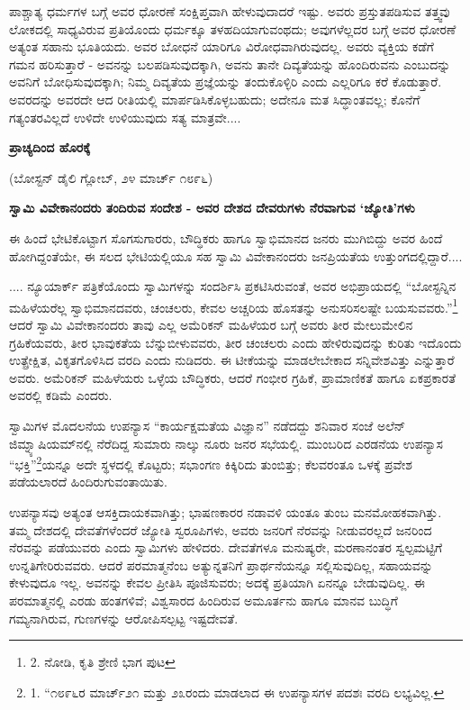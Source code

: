 ಪಾಶ್ಚಾತ್ಯ ಧರ್ಮಗಳ ಬಗ್ಗೆ ಅವರ ಧೋರಣೆ ಸಂಕ್ಷಿಪ್ತವಾಗಿ ಹೇಳುವುದಾದರೆ ಇಷ್ಟು. ಅವರು ಪ್ರಸ್ತುತಪಡಿಸುವ ತತ್ತ್ವವು ಲೋಕದಲ್ಲಿ ಸಾಧ್ಯವಿರುವ ಪ್ರತಿಯೊಂದು ಧರ್ಮಕ್ಕೂ ತಳಹದಿಯಾಗುವಂಥದು; ಅವುಗಳೆಲ್ಲದರ ಬಗ್ಗೆ ಅವರ ಧೋರಣೆ ಅತ್ಯಂತ ಸಹಾನು ಭೂತಿಯದು. ಅವರ ಬೋಧನೆ ಯಾರಿಗೂ ವಿರೋಧವಾಗಿರುವುದಲ್ಲ. ಅವರು ವ್ಯಕ್ತಿಯ ಕಡೆಗೆ ಗಮನ ಹರಿಸುತ್ತಾರೆ - ಅವನನ್ನು ಬಲಪಡಿಸುವುದಕ್ಕಾಗಿ, ಅವನು ತಾನೇ ದಿವ್ಯತೆಯನ್ನು ಹೊಂದಿರುವನು ಎಂಬುದನ್ನು ಅವನಿಗೆ ಬೋಧಿಸುವುದಕ್ಕಾಗಿ; ನಿಮ್ಮ ದಿವ್ಯತೆಯ ಪ್ರಜ್ಞೆಯನ್ನು ತಂದುಕೊಳ್ಳಿರಿ ಎಂದು ಎಲ್ಲರಿಗೂ ಕರೆ ಕೊಡುತ್ತಾರೆ. ಅವರದನ್ನು ಅವರದೇ ಆದ ರೀತಿಯಲ್ಲಿ ಮಾರ್ಪಡಿಸಿಕೊಳ್ಳಬಹುದು; ಅದೇನೂ ಮತ ಸಿದ್ಧಾಂತವಲ್ಲ; ಕೊನೆಗೆ ಗತ್ಯಂತರವಿಲ್ಲದೆ ಉಳಿದೇ ಉಳಿಯುವುದು ಸತ್ಯ ಮಾತ್ರವೇ....

\begin{center}
\textbf{ಪ್ರಾಚ್ಯದಿಂದ ಹೊರಕ್ಕೆ}
\end{center}

\begin{center}
(ಬೋಸ್ಟನ್ ಡೈಲಿ ಗ್ಲೋಬ್, ೨೪ ಮಾರ್ಚ್ ೧೮೯೬)
\end{center}

\begin{center}
\textbf{ಸ್ವಾಮಿ ವಿವೇಕಾನಂದರು ತಂದಿರುವ ಸಂದೇಶ - ಅವರ ದೇಶದ ದೇವರುಗಳು ನೆರವಾಗುವ ‘ಜ್ಯೋತಿ’ಗಳು}
\end{center}

ಈ ಹಿಂದೆ ಭೇಟಿಕೊಟ್ಟಾಗ ಸೊಗಸುಗಾರರು, ಬೌದ್ಧಿಕರು ಹಾಗೂ ಸ್ವಾಭಿಮಾನದ ಜನರು ಮುಗಿಬಿದ್ದು ಅವರ ಹಿಂದೆ ಹೋಗಿದ್ದಂತೆಯೇ, ಈ ಸಲದ ಭೇಟಿಯಲ್ಲಿಯೂ ಸಹ ಸ್ವಾಮಿ ವಿವೇಕಾನಂದರು ಜನಪ್ರಿಯತೆಯ ಉತ್ತುಂಗದಲ್ಲಿದ್ದಾರೆ....

.... ನ್ಯೂಯಾರ್ಕ್ ಪತ್ರಿಕೆಯೊಂದು ಸ್ವಾಮಿಗಳನ್ನು ಸಂದರ್ಶಿಸಿ ಪ್ರಕಟಿಸಿರುವಂತೆ, ಅವರ ಅಭಿಪ್ರಾಯದಲ್ಲಿ “ಬೋಸ್ಟನ್ನಿನ ಮಹಿಳೆಯರೆಲ್ಲ ಸ್ವಾಭಿಮಾನದವರು, ಚಂಚಲರು, ಕೇವಲ ಅಚ್ಚರಿಯ ಹೊಸತನ್ನು ಅನುಸರಿಸಲಷ್ಟೇ ಬಯಸುವವರು.”\footnote{2. ನೋಡಿ, ಕೃತಿ ಶ್ರೇಣಿ ಭಾಗ  ಪುಟ } ಆದರೆ ಸ್ವಾಮಿ ವಿವೇಕಾನಂದರು ತಾವು ಎಲ್ಲ ಅಮೆರಿಕನ್ ಮಹಿಳೆಯರ ಬಗ್ಗೆ ಅವರು ತೀರ ಮೇಲುಮೇಲಿನ ಗ್ರಹಿಕೆಯವರು, ತೀರ ಭಾವುಕತೆಯ ಬೆನ್ನುಬೀಳುವವರು, ತೀರ ಚಂಚಲರು ಎಂದು ಹೇಳಿರುವುದನ್ನು ಕುರಿತು ಇದೊಂದು ಉತ್ಪ್ರೇಕ್ಷಿತ, ವಿಕೃತಗೊಳಿಸಿದ ವರದಿ ಎಂದು ನುಡಿದರು. ಈ ಟೀಕೆಯನ್ನು ಮಾಡಲೇಬೇಕಾದ ಸನ್ನಿವೇಶವಿತ್ತು ಎನ್ನುತ್ತಾರೆ ಅವರು. ಅಮೆರಿಕನ್ ಮಹಿಳೆಯರು ಒಳ್ಳೆಯ ಬೌದ್ಧಿಕರು, ಆದರೆ ಗಂಭೀರ ಗ್ರಹಿಕೆ, ಪ್ರಾಮಾಣಿಕತೆ ಹಾಗೂ ಏಕಪ್ರಕಾರತೆ ಅವರಲ್ಲಿ ಕಡಿಮೆ ಎಂದರು.

ಸ್ವಾಮಿಗಳ ಮೊದಲನೆಯ ಉಪನ್ಯಾಸ “ಕಾರ್ಯಕ್ಷಮತೆಯ ವಿಜ್ಞಾನ” ನಡೆದದ್ದು ಶನಿವಾರ ಸಂಜೆ ಅಲೆನ್ ಜಿಮ್ನ್ಯಾಷಿಯಮ್​ನಲ್ಲಿ ನೆರೆದಿದ್ದ ಸುಮಾರು ನಾಲ್ಕು ನೂರು ಜನರ ಸಭೆಯಲ್ಲಿ. ಮುಂಬರಿದ ಎರಡನೆಯ ಉಪನ್ಯಾಸ “ಭಕ್ತಿ”\footnote{1. “೧೮೯೬ರ ಮಾರ್ಚ್೨೧ ಮತ್ತು ೨೩ರಂದು ಮಾಡಲಾದ ಈ ಉಪನ್ಯಾಸಗಳ ಪದಶಃ ವರದಿ ಲಭ್ಯವಿಲ್ಲ.}ಯನ್ನೂ ಅದೇ ಸ್ಥಳದಲ್ಲಿ ಕೊಟ್ಟರು; ಸಭಾಂಗಣ ಕಿಕ್ಕಿರಿದು ತುಂಬಿತ್ತು; ಕೆಲವರಂತೂ ಒಳಕ್ಕೆ ಪ್ರವೇಶ ಪಡೆಯಲಾರದೆ ಹಿಂದಿರುಗುವಂತಾಯಿತು.

ಉಪನ್ಯಾಸವು ಅತ್ಯಂತ ಆಸಕ್ತಿದಾಯಕವಾಗಿತ್ತು; ಭಾಷಣಕಾರರ ನಡಾವಳಿ ಯಂತೂ ತುಂಬ ಮನಮೋಹಕವಾಗಿತ್ತು. ತಮ್ಮ ದೇಶದಲ್ಲಿ ದೇವತೆಗಳೆಂದರೆ ಜ್ಯೋತಿ ಸ್ವರೂಪಿಗಳು, ಅವರು ಜನರಿಗೆ ನೆರವನ್ನು ನೀಡುವರಲ್ಲದೆ ಜನರಿಂದ ನೆರವನ್ನು ಪಡೆಯುವರು ಎಂದು ಸ್ವಾಮಿಗಳು ಹೇಳಿದರು. ದೇವತೆಗಳೂ ಮನುಷ್ಯರೇ, ಮರಣಾನಂತರ ಸ್ವಲ್ಪಮಟ್ಟಿಗೆ ಉನ್ನತಿಗೇರಿರುವವರು. ಆದರೆ ಪರಮಾತ್ಮನೆಂಬ ಅತ್ಯುನ್ನತನಿಗೆ ಪ್ರಾರ್ಥನೆಯನ್ನೂ ಸಲ್ಲಿಸುವುದಿಲ್ಲ, ಸಹಾಯವನ್ನು ಕೇಳುವುದೂ ಇಲ್ಲ. ಅವನನ್ನು ಕೇವಲ ಪ್ರೀತಿಸಿ ಪೂಜಿಸುವರು; ಅದಕ್ಕೆ ಪ್ರತಿಯಾಗಿ ಏನನ್ನೂ ಬೇಡುವುದಿಲ್ಲ. ಈ ಪರಮಾತ್ಮನಲ್ಲಿ ಎರಡು ಹಂತಗಳಿವೆ; ವಿಶ್ವಸಾರದ ಹಿಂದಿರುವ ಅಮೂರ್ತನು ಹಾಗೂ ಮಾನವ ಬುದ್ಧಿಗೆ ಗಮ್ಯನಾಗಿರುವ, ಗುಣಗಳನ್ನು ಆರೋಪಿಸಲ್ಪಟ್ಟ ಇಷ್ಟದೇವತೆ.

